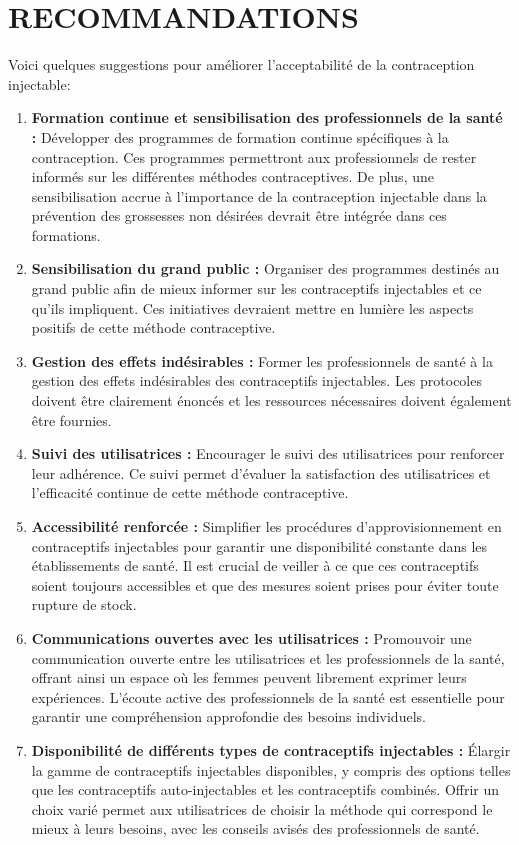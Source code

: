 \pagebreak

\section{RECOMMANDATIONS}

Voici quelques suggestions pour améliorer l’acceptabilité de la contraception injectable:

\begin{enumerate}[label=\arabic*., leftmargin=*]
  \item	\textbf{Formation continue et sensibilisation des professionnels de la santé :} Développer des programmes de formation continue spécifiques à la contraception. Ces programmes permettront aux professionnels de rester informés sur les différentes méthodes contraceptives. De plus, une sensibilisation accrue à l’importance de la contraception injectable dans la prévention des grossesses non désirées devrait être intégrée dans ces formations. 
  \item \textbf{Sensibilisation du grand public :}  Organiser des programmes destinés au grand public afin de mieux informer sur les contraceptifs injectables et ce qu’ils impliquent. Ces initiatives devraient mettre en lumière les aspects positifs de cette méthode contraceptive.  
  \item \textbf{Gestion des effets indésirables :} Former les professionnels de santé à la gestion des effets indésirables des contraceptifs injectables. Les protocoles doivent être clairement énoncés et les ressources nécessaires doivent également être fournies. 
  \item \textbf{Suivi des utilisatrices :} Encourager le suivi des utilisatrices pour renforcer leur adhérence. Ce suivi permet d’évaluer la satisfaction des utilisatrices et l’efficacité continue de cette méthode contraceptive.  
  \item \textbf{Accessibilité renforcée :} Simplifier les procédures d’approvisionnement en contraceptifs injectables pour garantir une disponibilité constante dans les établissements de santé. Il est crucial de veiller à ce que ces contraceptifs soient toujours accessibles et que des mesures soient prises pour éviter toute rupture de stock.
  \item \textbf{Communications ouvertes avec les utilisatrices :} Promouvoir une communication ouverte entre les utilisatrices et les professionnels de la santé, offrant ainsi un espace où les femmes peuvent librement exprimer leurs expériences. L’écoute active des professionnels de la santé est essentielle pour garantir une compréhension approfondie des besoins individuels.
  \item \textbf{Disponibilité de différents types de contraceptifs injectables :} Élargir la gamme de contraceptifs injectables disponibles, y compris des options telles que les contraceptifs auto-injectables et les contraceptifs combinés. Offrir un choix varié permet aux utilisatrices de choisir la méthode qui correspond le mieux à leurs besoins, avec les conseils avisés des professionnels de santé.     
\end{enumerate}


